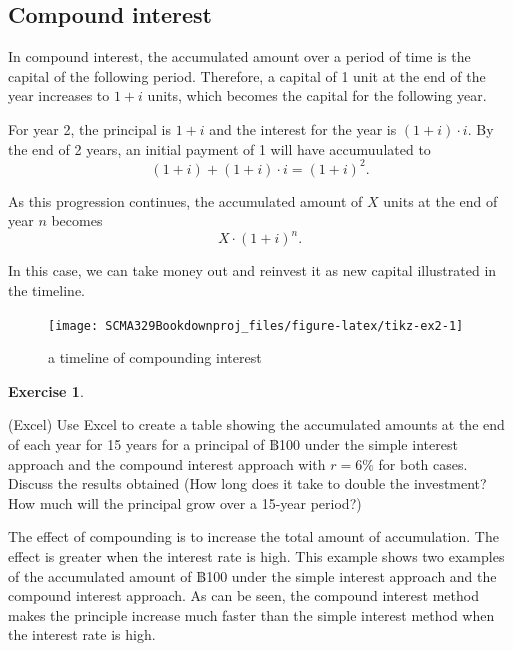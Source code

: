 \documentclass[
]{book}
\theoremstyle{definition}
\theoremstyle{definition}
\theoremstyle{definition}
\newtheorem{exercise}{Exercise}[chapter]
\theoremstyle{definition}
\theoremstyle{remark}
\begin{document}
\hypertarget{compound-interest}{%
\subsection{Compound interest}\label{compound-interest}}

In compound interest, the accumulated amount over a period of time is the capital of the following period. Therefore, a capital of 1 unit at the end of the year increases to \(1 + i\) units, which becomes the capital for the following year.

For year 2, the principal is \(1 + i\) and the interest for the year is
\(( 1 + i ) \cdot i\). By the end of 2 years, an initial payment of 1 will have accumuulated to
\[ (1+i) + ( 1 + i ) \cdot i = (1+i)^2.\]

As this progression continues, the accumulated amount of \(X\) units at the end of year \(n\) becomes
\[ X\cdot(1 + i)^n. \]

\theNote In this case, we can take money out and reinvest it as new capital illustrated in the timeline.

\begin{figure}

{\centering \texttt{[image: SCMA329Bookdownproj\_files/figure-latex/tikz-ex2-1]} 

}

\caption{a timeline of compounding interest}\label{fig:tikz-ex2}
\end{figure}

\begin{exercise}
\protect\hypertarget{exr:unlabeled-div-4}{}\label{exr:unlabeled-div-4}

(Excel) Use Excel to create a table showing the accumulated amounts at the end of each year for 15 years for a principal of ฿100 under the simple interest approach and the compound interest approach with \(r = 6\%\) for both cases.
Discuss the results obtained (How long does it take to double the investment? How much will the principal grow over a 15-year period?)

\end{exercise}

The effect of compounding is to increase the total amount of accumulation. The effect is greater when the interest rate is high. This example shows two examples of the accumulated amount of ฿100 under the simple interest approach and the compound interest approach. As can be seen, the compound interest method makes the principle increase much faster than the simple interest method when the interest rate is high.
\end{document}

